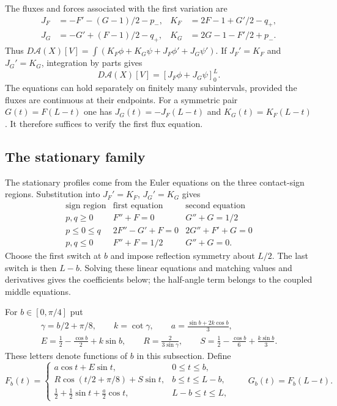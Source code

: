 The fluxes and forces associated with the first variation are
\begin{align*}
 J_F&=-F'-(G-1)/2-p_-,& K_F&=2F-1+G'/2-q_+,\\
 J_G&=-G'+(F-1)/2-q_+,& K_G&=2G-1-F'/2+p_-.
\end{align*}
Thus $D\mathcal A(X)[V]=\int(K_F\phi+K_G\psi+J_F\phi'+J_G\psi')$.
If $J_F'=K_F$ and $J_G'=K_G$, integration by parts gives
\begin{equation}\label{eq:calibration-boundary-flux}
 D\mathcal A(X)[V]=[J_F\phi+J_G\psi]_0^L.
\end{equation}
The equations can hold separately on finitely many subintervals,
provided the fluxes are continuous at their endpoints.
For a symmetric pair $G(t)=F(L-t)$ one has
$J_G(t)=-J_F(L-t)$ and $K_G(t)=K_F(L-t)$.
It therefore suffices to verify the first flux equation.

\subsection{The stationary family}

The stationary profiles come from the Euler equations on the three
contact-sign regions. Substitution into $J_F'=K_F$, $J_G'=K_G$ gives
\[
 \begin{array}{c|cc}
 \text{sign region}&\text{first equation}&\text{second equation}\\ \hline
 p,q\ge0&F''+F=0&G''+G=1/2\\
 p\le0\le q&2F''-G'+F=0&2G''+F'+G=0\\
 p,q\le0&F''+F=1/2&G''+G=0.
 \end{array}
\]
Choose the first switch at $b$ and impose reflection symmetry about
$L/2$. The last switch is then $L-b$. Solving these linear equations
and matching values and derivatives gives the coefficients below; the
half-angle term belongs to the coupled middle equations.

For $b\in[0,\pi/4]$ put
\begin{equation}\label{eq:stationary-family-parameters}
 \begin{gathered}
 \gamma=b/2+\pi/8,\qquad k=\cot\gamma,\qquad
 a=\frac{\sin b+2k\cos b}{3},\\
 E=\frac12-\frac{\cos b}{2}+k\sin b,\qquad
 R=\frac{2}{3\sin\gamma},\qquad
 S=\frac12-\frac{\cos b}{6}+\frac{k\sin b}{3}.
 \end{gathered}
\end{equation}
These letters denote functions of $b$ in this subsection.
Define
\begin{equation}\label{eq:stationary-family}
 F_b(t)=
 \begin{cases}
 a\cos t+E\sin t,&0\le t\le b,\\
 R\cos(t/2+\pi/8)+S\sin t,&b\le t\le L-b,\\
 \tfrac12+\tfrac12\sin t+\tfrac a2\cos t,&L-b\le t\le L,
 \end{cases}
 \qquad G_b(t)=F_b(L-t).
\end{equation}

